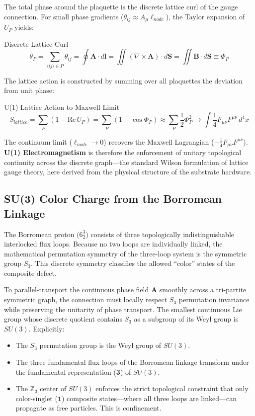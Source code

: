 The total phase around the plaquette is the discrete lattice curl of the gauge connection. For small phase gradients ($\theta_{ij} \approx A_\mu \ell_{node}$), the Taylor expansion of $U_P$ yields:
\begin{resultbox}{Discrete Lattice Curl}
\begin{equation}
    \theta_P = \sum_{\langle ij\rangle \in P} \theta_{ij} = \oint \mathbf{A} \cdot d\mathbf{l} = \iint (\nabla \times \mathbf{A}) \cdot d\mathbf{S} = \iint \mathbf{B} \cdot d\mathbf{S} \equiv \Phi_P
\end{equation}
\end{resultbox}

The lattice action is constructed by summing over all plaquettes the deviation from unit phase:
\begin{resultbox}{U(1) Lattice Action to Maxwell Limit}
\begin{equation}
    S_{lattice} = \sum_P \left(1 - \text{Re}\, U_P\right) = \sum_P \left(1 - \cos\Phi_P\right) \approx \sum_P \frac{1}{2}\Phi_P^2 \longrightarrow \int \frac{1}{4}F_{\mu\nu}F^{\mu\nu}\, d^4x
\end{equation}
\end{resultbox}

The continuum limit ($\ell_{node} \to 0$) recovers the Maxwell Lagrangian ($-\frac{1}{4}F_{\mu\nu}F^{\mu\nu}$). \textbf{U(1) Electromagnetism} is therefore the enforcement of unitary topological continuity across the discrete graph---the standard Wilson formulation of lattice gauge theory, here derived from the physical structure of the substrate hardware.

\subsection{SU(3) Color Charge from the Borromean Linkage}
The Borromean proton ($6^3_2$) consists of three topologically indistinguishable interlocked flux loops. Because no two loops are individually linked, the mathematical permutation symmetry of the three-loop system is the symmetric group $S_3$. This discrete symmetry classifies the allowed ``color'' states of the composite defect.

To parallel-transport the continuous phase field $\mathbf{A}$ smoothly across a tri-partite symmetric graph, the connection must locally respect $S_3$ permutation invariance while preserving the unitarity of phase transport. The smallest continuous Lie group whose discrete quotient contains $S_3$ as a subgroup of its Weyl group is $SU(3)$. Explicitly:
\begin{itemize}
    \item The $S_3$ permutation group is the Weyl group of $SU(3)$.
    \item The three fundamental flux loops of the Borromean linkage transform under the fundamental representation (\textbf{3}) of $SU(3)$.
    \item The $\mathbb{Z}_3$ center of $SU(3)$ enforces the strict topological constraint that only color-singlet ($\mathbf{1}$) composite states---where all three loops are linked---can propagate as free particles. This is confinement.
\end{itemize}

